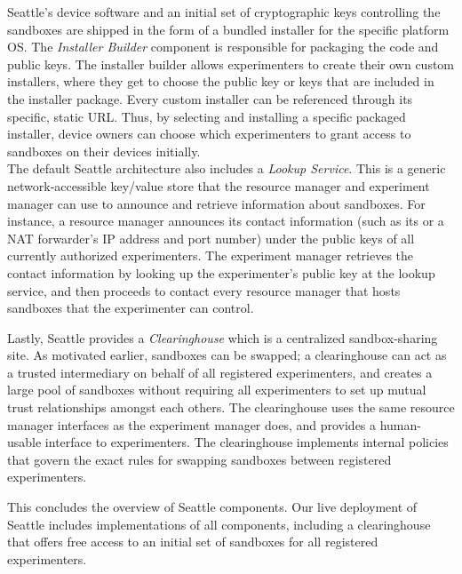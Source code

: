 Seattle's device software and an initial set of cryptographic
keys controlling the sandboxes are shipped in the form of a bundled
installer for the specific platform \gls{OS}.
The \textit{Installer Builder} component is responsible for
packaging the code and public keys.
The installer builder allows experimenters to create their own
custom installers, where they get to choose the public key or keys
that are included in the installer package. Every custom installer
can be referenced through its specific, static \gls{URL}.
Thus, by selecting and installing a specific packaged installer,
device owners can choose which experimenters to grant
access to sandboxes on their devices initially.
\\


The default Seattle architecture also includes a
\textit{Lookup Service}. This is a generic network-accessible
key/value store that the resource manager and experiment manager
can use to announce and retrieve information about sandboxes.
For instance, a resource manager announces its contact information
(such as its or a NAT forwarder's IP address and port number) under
the public keys of all currently authorized experimenters.
The experiment manager retrieves the contact information by looking up
the experimenter's public key at the lookup service, and then
proceeds to contact every resource manager that hosts sandboxes
that the experimenter can control.

Lastly, Seattle provides a \textit{Clearinghouse} which is a
centralized sandbox-sharing site. As motivated earlier,
sandboxes can be swapped; a clearinghouse can act as a trusted
intermediary on behalf of all registered experimenters, and creates
a large pool of sandboxes without requiring all experimenters to
set up mutual trust relationships amongst each others.
The clearinghouse uses the same resource manager interfaces as the
experiment manager does, and provides a human-usable interface to
experimenters. The clearinghouse implements internal policies
that govern the exact rules for swapping sandboxes between
registered experimenters.

This concludes the overview of Seattle components. Our live deployment
of Seattle includes implementations of all components, including a
clearinghouse that offers free access to an initial set of sandboxes
for all registered experimenters.




